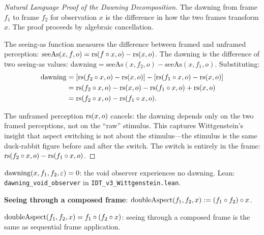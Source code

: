 \begin{proof}[Natural Language Proof of the Dawning Decomposition]
The dawning from frame $f_1$ to frame $f_2$ for observation $x$ is the
difference in how the two frames transform $x$. The proof proceeds by
algebraic cancellation.

The seeing-as function measures the difference between framed and unframed
perception: $\mathrm{seeAs}(x, f, o) = \mathrm{rs}(f \circ x, o) - \mathrm{rs}(x, o)$.
The dawning is the difference of two seeing-as values: $\mathrm{dawning}
= \mathrm{seeAs}(x, f_2, o) - \mathrm{seeAs}(x, f_1, o)$. Substituting:
\begin{align*}
\mathrm{dawning} &= [\mathrm{rs}(f_2 \circ x, o) - \mathrm{rs}(x, o)]
                    - [\mathrm{rs}(f_1 \circ x, o) - \mathrm{rs}(x, o)] \\
                  &= \mathrm{rs}(f_2 \circ x, o) - \mathrm{rs}(x, o)
                    - \mathrm{rs}(f_1 \circ x, o) + \mathrm{rs}(x, o) \\
                  &= \mathrm{rs}(f_2 \circ x, o) - \mathrm{rs}(f_1 \circ x, o).
\end{align*}

The unframed perception $\mathrm{rs}(x, o)$ cancels: the dawning depends only on the
two framed perceptions, not on the ``raw'' stimulus. This captures Wittgenstein's
insight that aspect switching is not about the stimulus---the stimulus is the same
duck-rabbit figure before and after the switch. The switch is entirely in the
frame: $\mathrm{rs}(f_2 \circ x, o) - \mathrm{rs}(f_1 \circ x, o)$.
\end{proof}

\begin{theorem}
\label{thm:dawning-void-observer}
$\mathrm{dawning}(x, f_1, f_2, \varepsilon) = 0$: the void observer experiences no dawning.
Lean: \texttt{dawning\_void\_observer} in \texttt{IDT\_v3\_Wittgenstein.lean}.
\end{theorem}

\begin{definition}
\label{def:double-aspect}
\textbf{Seeing through a composed frame}: $\mathrm{doubleAspect}(f_1, f_2, x) :=
(f_1 \circ f_2) \circ x$.
\end{definition}

\begin{theorem}
\label{thm:double-aspect-sequential}
$\mathrm{doubleAspect}(f_1, f_2, x) = f_1 \circ (f_2 \circ x)$: seeing
through a composed frame is the same as sequential frame application.
\end{theorem}

